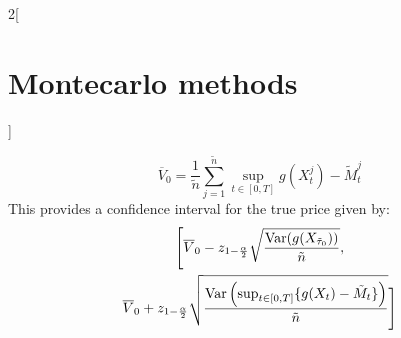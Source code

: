 \documentclass[../../../main_math.tex]{subfiles}
\begin{document}
\begin{multicols}{2}[\section{Montecarlo methods}]
\begin{remark}
    $$
      \overline{V}_0=\frac{1}{\tilde{n}} \sum_{j=1}^{\tilde{n}}\sup_{t\in[0,T]}g(X_t^{j})-\tilde{M}_t^{j}
    $$
    This provides a confidence interval for the true price given by:
    \begin{multline*}
      \Bigg[\overline{V}_0-z_{1-\frac{\alpha}{2}}\sqrt{\frac{\mathrm{Var}(g(X_{\tilde{\tau}_0}))}{\tilde{n}}},\\\overline{V}_0+z_{1-\frac{\alpha}{2}}\sqrt{\frac{\mathrm{Var}\left(\sup_{t\in[0,T]}\{g(X_t)-\tilde{M}_t\}\right)}{\tilde{n}}}\Bigg]
    \end{multline*}
  \end{remark}
\end{multicols}
\end{document}
